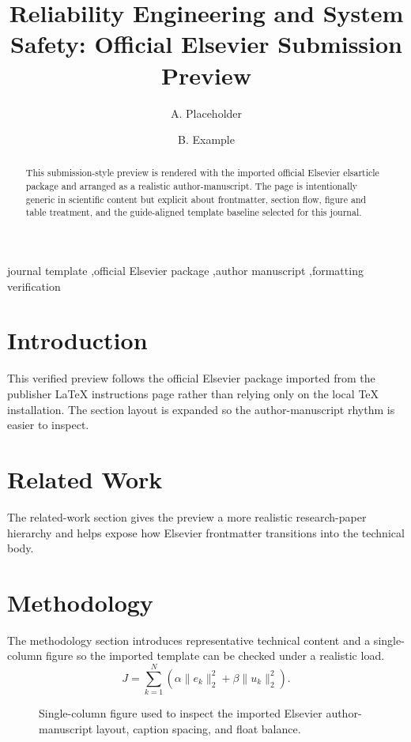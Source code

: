 \documentclass[preprint,12pt]{elsarticle}
\begin{document}
\begin{frontmatter}
\title{Reliability Engineering and System Safety: Official Elsevier Submission Preview}
\author{A. Placeholder}
\author{B. Example}
\address{Department of Verified Templates, Placeholder Institute}
\begin{abstract}
This submission-style preview is rendered with the imported official Elsevier elsarticle package and arranged as a realistic author-manuscript. The page is intentionally generic in scientific content but explicit about frontmatter, section flow, figure and table treatment, and the guide-aligned template baseline selected for this journal.
\end{abstract}
\begin{keyword}
journal template \sep official Elsevier package \sep author manuscript \sep formatting verification
\end{keyword}
\end{frontmatter}
\section{Introduction}
This verified preview follows the official Elsevier package imported from the publisher LaTeX instructions page rather than relying only on the local TeX installation. The section layout is expanded so the author-manuscript rhythm is easier to inspect.
\section{Related Work}
The related-work section gives the preview a more realistic research-paper hierarchy and helps expose how Elsevier frontmatter transitions into the technical body.
\section{Methodology}
The methodology section introduces representative technical content and a single-column figure so the imported template can be checked under a realistic load.
\begin{equation}
J = \sum_{k=1}^{N} \left( \alpha \|e_k\|_2^2 + \beta \|u_k\|_2^2 \right).
\end{equation}
\begin{figure}[t]
\centering
{}
\caption{Single-column figure used to inspect the imported Elsevier author-manuscript layout, caption spacing, and float balance.}
\end{figure}
\end{document}
